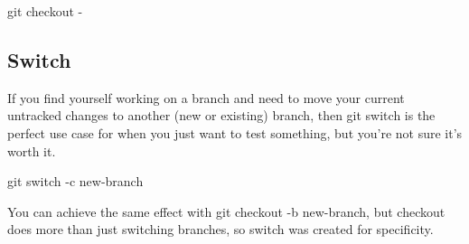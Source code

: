 \begin{git-bash}
    git checkout -
\end{git-bash}



\subsection{Switch}

If you find yourself working on a branch and need to move your current untracked changes to another (new or existing) branch, then git switch is the perfect use case for when you just want to test something, but you're not sure it's worth it.

\begin{git-bash}
    git switch -c new-branch
\end{git-bash}

You can achieve the same effect with git checkout -b new-branch, but checkout does more than just switching branches, so switch was created for specificity.






